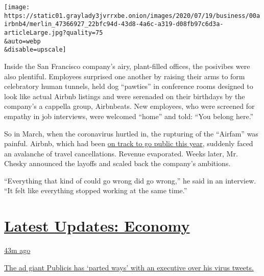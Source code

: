 \texttt{[image: https://static01.graylady3jvrrxbe.onion/images/2020/07/19/business/00airbnb4/merlin\_47366927\_22bfc94d-43d8-4a6c-a319-d08fb97c6d3a-articleLarge.jpg?quality=75\\\&auto=webp\\\&disable=upscale]}

Inside the San Francisco company's airy, plant-filled offices, the
posivibes were also plentiful. Employees surprised one another by
raising their arms to form celebratory human tunnels, held dog
``pawties'' in conference rooms designed to look like actual Airbnb
listings and were serenaded on their birthdays by the company's a
cappella group, Airbnbeats. New employees, who were screened for empathy
in job interviews, were welcomed ``home'' and told: ``You belong here.''

So in March, when the coronavirus hurtled in, the rupturing of the
``Airfam'' was painful. Airbnb, which had been
\href{https://www.nytimes3xbfgragh.onion/2019/09/19/technology/airbnb-ipo-2020.html}{on
track to go public this year}, suddenly faced an avalanche of travel
cancellations. Revenue evaporated. Weeks later, Mr. Chesky announced the
layoffs and scaled back the company's ambitions.

``Everything that kind of could go wrong did go wrong,'' he said in an
interview. ``It felt like everything stopped working at the same time.''

\hypertarget{latest-updates-economy}{%
\section{\texorpdfstring{\href{https://www.nytimes3xbfgragh.onion/live/2020/08/04/business/stock-market-today-coronavirus?action=click\&pgtype=Article\&state=default\&region=MAIN_CONTENT_1\&context=storylines_live_updates}{Latest
Updates:
Economy}}{Latest Updates: Economy}}\label{latest-updates-economy}}

\href{https://www.nytimes3xbfgragh.onion/live/2020/08/04/business/stock-market-today-coronavirus?action=click\&pgtype=Article\&state=default\&region=MAIN_CONTENT_1\&context=storylines_live_updates\#the-ad-giant-publicis-has-parted-ways-with-an-executive-over-his-virus-tweets}{43m
ago}

\href{https://www.nytimes3xbfgragh.onion/live/2020/08/04/business/stock-market-today-coronavirus?action=click\&pgtype=Article\&state=default\&region=MAIN_CONTENT_1\&context=storylines_live_updates\#the-ad-giant-publicis-has-parted-ways-with-an-executive-over-his-virus-tweets}{The
ad giant Publicis has `parted ways' with an executive over his virus
tweets.}

